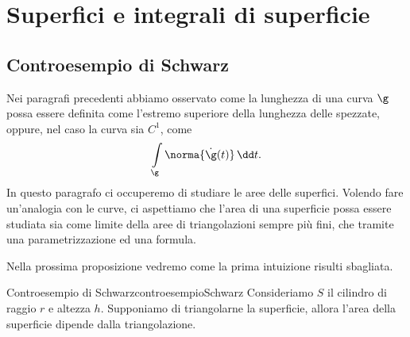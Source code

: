 %
%
\chapter{Superfici e integrali di superficie}
\section{Controesempio di Schwarz}

Nei paragrafi precedenti abbiamo osservato come la lunghezza di una curva \(\g\) possa essere definita come l'estremo superiore della lunghezza delle spezzate, oppure, nel caso la curva sia \(C^1\), come
\[
	\int\limits_\g \norma{\dot{\g}(t)}\,\dd t.
\]
In questo paragrafo ci occuperemo di studiare le aree delle superfici.
Volendo fare un'analogia con le curve, ci aspettiamo che l'area di una superficie possa essere studiata sia come limite della aree di triangolazioni sempre più fini, che tramite una parametrizzazione ed una formula.

Nella prossima proposizione vedremo come la prima intuizione risulti sbagliata.

\begin{prop}{Controesempio di Schwarz}{controesempioSchwarz}
	Consideriamo \(S\) il cilindro di raggio \(r\) e altezza \(h\).
	Supponiamo di triangolarne la superficie, allora l'area della superficie dipende dalla triangolazione.
\end{prop}

